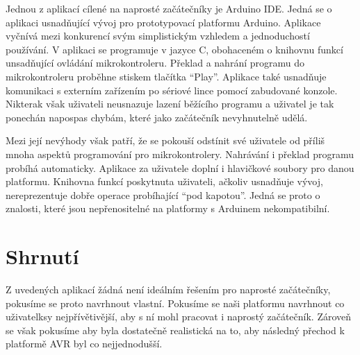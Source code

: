 Jednou z aplikací cílené na naprosté začátečníky je Arduino IDE\cite{arduino-ide}. Jedná se o aplikaci usnadňující vývoj pro prototypovací platformu Arduino. Aplikace vyčnívá mezi konkurencí svým simplistickým vzhledem a jednoduchostí používání. V aplikaci se programuje v jazyce C, obohaceném o knihovnu funkcí unsadňující ovládání mikrokontroleru. Překlad a nahrání programu do mikrokontroleru proběhne stiskem tlačítka ``Play''. Aplikace také usnadňuje komunikaci s externím zařízením po sériové lince pomocí zabudované konzole. Nikterak však uživateli neusnazuje lazení běžícího programu a uživatel je tak ponechán napospas chybám, které jako začátečník nevyhnutelně udělá.

Mezi její nevýhody však patří, že se pokouší odstínit své uživatele od příliš mnoha aspektů programování pro mikrokontrolery. Nahrávání i překlad programu probíhá automaticky. Aplikace za uživatele doplní i hlavičkové soubory pro danou platformu. Knihovna funkcí poskytnuta uživateli, ačkoliv usnadňuje vývoj, nereprezentuje dobře operace probíhající ``pod kapotou''. Jedná se proto o znalosti, které jsou nepřenositelné na platformy s Arduinem nekompatibilní.


\section{Shrnutí}

Z uvedených aplikací žádná není ideálním řešením pro naprosté začátečníky, pokusíme se proto navrhnout vlastní. Pokusíme se naši platformu navrhnout co uživatelksy nejpřívětivější, aby s ní mohl pracovat i naprostý začátečník. Zároveň se však pokusíme aby byla dostatečně realistická na to, aby následný přechod k platformě AVR byl co nejjednodušší.